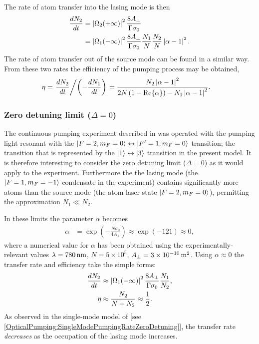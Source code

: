The rate of atom transfer into the lasing mode is then
\begin{align}
    \frac{d N_2}{dt} &= \left|\Omega_2(+\infty)\right|^2 \frac{8 A_\perp}{\Gamma \sigma_0} \\
     &= \left|\Omega_1(-\infty)\right|^2 \frac{8 A_\perp}{\Gamma \sigma_0} \frac{N_1}{N} \frac{N_2}{N} \left|\alpha - 1\right|^2.
\end{align}
The rate of atom transfer out of the source mode can be found in a similar way.  From these two rates the efficiency of the pumping process may be obtained,
\begin{align}
    \eta &= \left.\frac{d N_2}{d t} \middle / \left(- \frac{d N_1}{dt}\right)\right. = \frac{N_2 \left|\alpha - 1\right|^2}{2 N \left(1 - \operatorname{Re}\{\alpha\}\right) - N_1 \left|\alpha -1\right|^2}.
\end{align}

\subsubsection{Zero detuning limit ($\Delta = 0$)}

The continuous pumping experiment described in  was operated with the pumping light resonant with the ${\left|F=2, m_F=0\right>} \leftrightarrow {\ensuremath{\left|F'=1, m_F=0\right>}}$ transition; the transition that is represented by the ${\left|1\right>} \leftrightarrow {\ensuremath{\left|3\right>}}$ transition in the present model.  It is therefore interesting to consider the zero detuning limit ($\Delta = 0$) as it would apply to the experiment.  Furthermore the the lasing mode (the ${\left|F=1, m_F=-1\right>}$ condensate in the experiment) contains significantly more atoms than the source mode (the atom laser state ${\left|F=2, m_F=0\right>}$), permitting the approximation $N_1 \ll N_2$.  

In these limits the parameter $\alpha$ becomes
\begin{align}
    \alpha &= \exp\left( - \frac{N \sigma_0}{4 A_\perp}\right) \approx \exp(- 121) \approx 0,
\end{align}
where a numerical value for $\alpha$ has been obtained using the experimentally-relevant values $\lambda = \unit[780]{nm}$, $N = 5 \times 10^5$, $A_\perp = 3\times\unit[10^{-10}]{m\textsuperscript{2}}$.  Using $\alpha \approx 0$ the transfer rate and efficiency take the simple forms:
\begin{align}
    \frac{d N_2}{dt} &\approx \abs{\Omega_1(-\infty)}^2 \frac{8 A_\perp}{\Gamma \sigma_0} \frac{N_1}{N_2}, \\
    \eta &\approx \frac{N_2}{N + N_2} \approx \frac{1}{2} \label{OpticalPumping:OverlappingCondensates:ZeroDetuningEfficiency}.
\end{align}
As observed in the single-mode model of  [see \eqref{OpticalPumping:SingleModePumpingRateZeroDetuning}], the transfer rate \emph{decreases} as the occupation of the lasing mode increases.  

